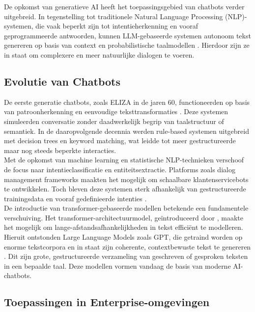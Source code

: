 De opkomst van generatieve AI heeft het toepassingsgebied van chatbots verder uitgebreid. In tegenstelling tot traditionele Natural Language Processing (NLP)-systemen, die vaak beperkt zijn tot intentieherkenning en vooraf geprogrammeerde antwoorden, kunnen LLM-gebaseerde systemen autonoom tekst genereren op basis van context en probabilistische taalmodellen \autocite{brown2020language}. Hierdoor zijn ze in staat om complexere en meer natuurlijke dialogen te voeren.\\

\subsection{Evolutie van Chatbots}

De eerste generatie chatbots, zoals ELIZA in de jaren 60, functioneerden op basis van patroonherkenning en eenvoudige teksttransformaties \autocite{weizenbaum1966eliza}. Deze systemen simuleerden conversatie zonder daadwerkelijk begrip van taalstructuur of semantiek. In de daaropvolgende decennia werden rule-based systemen uitgebreid met decision trees en keyword matching, wat leidde tot meer gestructureerde maar nog steeds beperkte interacties.\\


Met de opkomst van machine learning en statistische NLP-technieken verschoof de focus naar intentieclassificatie en entiteitsextractie. Platforms zoals dialog management frameworks maakten het mogelijk om schaalbare klantenservicebots te ontwikkelen. Toch bleven deze systemen sterk afhankelijk van gestructureerde trainingsdata en vooraf gedefinieerde intenties \autocite{jurafsky2023speech}.\\

De introductie van transformer-gebaseerde modellen betekende een fundamentele verschuiving. Het transformer-architectuurmodel, geïntroduceerd door \textcite{vaswani2017attention}, maakte het mogelijk om lange-afstandsafhankelijkheden in tekst efficiënt te modelleren. Hieruit ontstonden Large Language Models zoals GPT, die getraind worden op enorme tekstcorpora en in staat zijn coherente, contextbewuste tekst te genereren \autocite{brown2020language}. Dit zijn grote, gestructureerde verzameling van geschreven of gesproken teksten in een bepaalde taal. Deze modellen vormen vandaag de basis van moderne AI-chatbots.\\

\subsection{Toepassingen in Enterprise-omgevingen}

